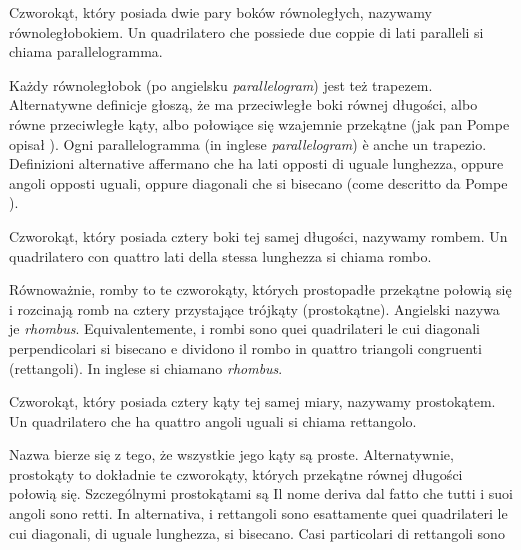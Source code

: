 \begin{definition}
[równoległobok] %
[parallelogramma] %
Czworokąt, który posiada dwie pary boków równoległych, nazywamy równoległobokiem. %
Un quadrilatero che possiede due coppie di lati paralleli si chiama parallelogramma. %
\end{definition}

Każdy równoległobok (po angielsku \emph{parallelogram}) jest też trapezem. %
Alternatywne definicje głoszą, że ma przeciwległe boki równej długości, albo równe przeciwległe kąty, albo połowiące się wzajemnie przekątne (jak pan Pompe opisał \cite[s. 37]{pompe_2022}). %
Ogni parallelogramma (in inglese \emph{parallelogram}) è anche un trapezio. %
Definizioni alternative affermano che ha lati opposti di uguale lunghezza, oppure angoli opposti uguali, oppure diagonali che si bisecano (come descritto da Pompe \cite[p. 37]{pompe_2022}). %

\begin{definition}
[romb] %
[rombo] %
Czworokąt, który posiada cztery boki tej samej długości, nazywamy rombem. %
Un quadrilatero con quattro lati della stessa lunghezza si chiama rombo. %
\end{definition}

Równoważnie, romby to te czworokąty, których prostopadłe przekątne połowią się i rozcinają romb na cztery przystające trójkąty (prostokątne). %
Angielski nazywa je \emph{rhombus}. %
Equivalentemente, i rombi sono quei quadrilateri le cui diagonali perpendicolari si bisecano e dividono il rombo in quattro triangoli congruenti (rettangoli). %
In inglese si chiamano \emph{rhombus}. %

\begin{definition}
[prostokąt] %
[rettangolo] %
Czworokąt, który posiada cztery kąty tej samej miary, nazywamy prostokątem. %
Un quadrilatero che ha quattro angoli uguali si chiama rettangolo. %
\end{definition}

Nazwa bierze się z tego, że wszystkie jego kąty są proste. %
Alternatywnie, prostokąty to dokładnie te czworokąty, których przekątne równej długości połowią się. %
Szczególnymi prostokątami są %
Il nome deriva dal fatto che tutti i suoi angoli sono retti. %
In alternativa, i rettangoli sono esattamente quei quadrilateri le cui diagonali, di uguale lunghezza, si bisecano. %
Casi particolari di rettangoli sono %

